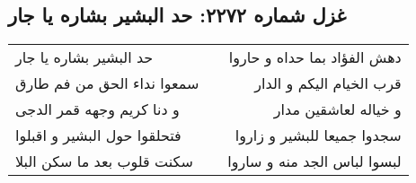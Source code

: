 \begin{center}
\section*{غزل شماره ۲۲۷۲: حد البشیر بشاره یا جار}
\label{sec:2272}
\begin{longtable}{l p{0.5cm} r}
حد البشیر بشاره یا جار
&&
دهش الفؤاد بما حداه و حاروا
\\
سمعوا نداء الحق من فم طارق
&&
قرب الخیام الیکم و الدار
\\
و دنا کریم وجهه قمر الدجی
&&
و خیاله لعاشقین مدار
\\
فتحلقوا حول البشیر و اقبلوا
&&
سجدوا جمیعا للبشیر و زاروا
\\
سکنت قلوب بعد ما سکن البلا
&&
لبسوا لباس الجد منه و ساروا
\\
\end{longtable}
\end{center}
